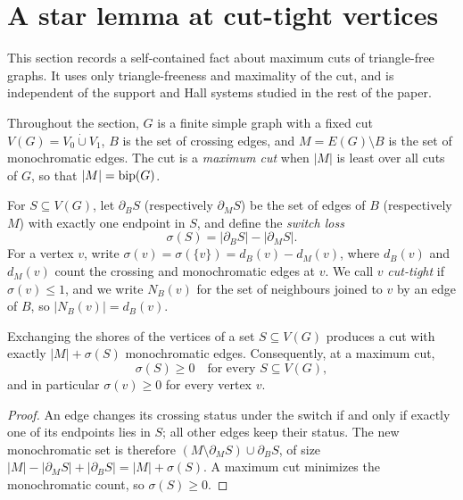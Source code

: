 
\section{A star lemma at cut-tight vertices}\label{sec:starlemma}

This section records a self-contained fact about maximum cuts of
triangle-free graphs. It uses only triangle-freeness and maximality of
the cut, and is independent of the support and Hall systems studied in
the rest of the paper.

Throughout the section, \(G\) is a finite simple graph with a fixed cut
\(V(G)=V_0\mathbin{\dot\cup}V_1\), \(B\) is the set of crossing edges,
and \(M=E(G)\setminus B\) is the set of monochromatic edges. The cut is
a \emph{maximum cut} when \(|M|\) is least over all cuts of \(G\), so
that \(|M|=\operatorname{bip}(G)\).

\begin{definition}\label{def:switchloss}
For \(S\subseteq V(G)\), let \(\partial_BS\) (respectively
\(\partial_MS\)) be the set of edges of \(B\) (respectively \(M\)) with
exactly one endpoint in \(S\), and define the \emph{switch loss}
\[
 \sigma(S)=|\partial_BS|-|\partial_MS|.
\]
For a vertex \(v\), write \(\sigma(v)=\sigma(\{v\})=d_B(v)-d_M(v)\),
where \(d_B(v)\) and \(d_M(v)\) count the crossing and monochromatic
edges at \(v\). We call \(v\) \emph{cut-tight} if \(\sigma(v)\le1\),
and we write \(N_B(v)\) for the set of neighbours joined to \(v\) by an
edge of \(B\), so \(|N_B(v)|=d_B(v)\).
\end{definition}

\begin{lemma}\label{lem:switchloss}
Exchanging the shores of the vertices of a set \(S\subseteq V(G)\)
produces a cut with exactly \(|M|+\sigma(S)\) monochromatic edges.
Consequently, at a maximum cut,
\[
 \sigma(S)\ge0\quad\text{for every }S\subseteq V(G),
\]
and in particular \(\sigma(v)\ge0\) for every vertex \(v\).
\end{lemma}

\begin{proof}
An edge changes its crossing status under the switch if and only if
exactly one of its endpoints lies in \(S\); all other edges keep their
status. The new monochromatic set is therefore
\((M\setminus\partial_MS)\cup\partial_BS\), of size
\(|M|-|\partial_MS|+|\partial_BS|=|M|+\sigma(S)\). A maximum cut
minimizes the monochromatic count, so \(\sigma(S)\ge0\).
\end{proof}

